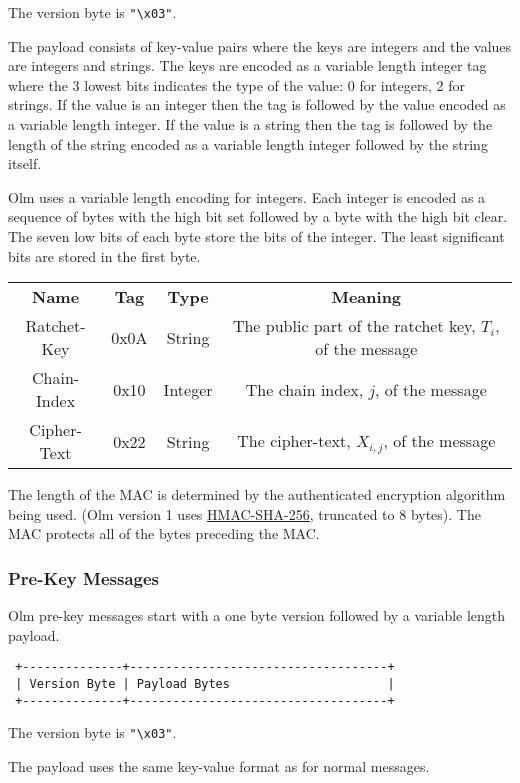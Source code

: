 \documentclass[10pt]{article}
\makeatletter
\newcommand\tmpset[2]{
  \begingroup
  #1
  #2
  \endgroup
}
\newcommand\autoscaletable[3][0pt]{
  \tmpset{\setlength\tabcolsep{#1}}{
    \noindent
    \begin{tabular*}{\textwidth}{@{\extracolsep{\fill}} #2}
      #3
    \end{tabular*}}
}
\makeatother
\begin{document}
The version byte is \texttt{"\textbackslash{}x03"}.

The payload consists of key-value pairs where the keys are integers and
the values are integers and strings. The keys are encoded as a variable
length integer tag where the 3 lowest bits indicates the type of the
value: 0 for integers, 2 for strings. If the value is an integer then
the tag is followed by the value encoded as a variable length integer.
If the value is a string then the tag is followed by the length of the
string encoded as a variable length integer followed by the string
itself.

Olm uses a variable length encoding for integers. Each integer is
encoded as a sequence of bytes with the high bit set followed by a byte
with the high bit clear. The seven low bits of each byte store the bits
of the integer. The least significant bits are stored in the first byte.

\autoscaletable{c c c c}{
\textbf{Name} & \textbf{Tag} & \textbf{Type} & \textbf{Meaning} \\
Ratchet-Key & 0x0A & String & The public part of the ratchet key, $T_i$, of
the message \\
Chain-Index & 0x10 & Integer & The chain index, $j$, of the message \\
Cipher-Text & 0x22 & String & The cipher-text, $X_{i,j}$, of the message}

The length of the MAC is determined by the authenticated encryption
algorithm being used. (Olm version 1 uses
\href{https://tools.ietf.org/html/rfc2104}{HMAC-SHA-256}, truncated to 8
bytes). The MAC protects all of the bytes preceding the MAC.

\subsubsection{Pre-Key Messages}\label{pre-key-messages}

Olm pre-key messages start with a one byte version followed by a
variable length payload.

\begin{verbatim}
 +--------------+------------------------------------+
 | Version Byte | Payload Bytes                      |
 +--------------+------------------------------------+
\end{verbatim}

The version byte is \texttt{"\textbackslash{}x03"}.

The payload uses the same key-value format as for normal messages.
\end{document}
